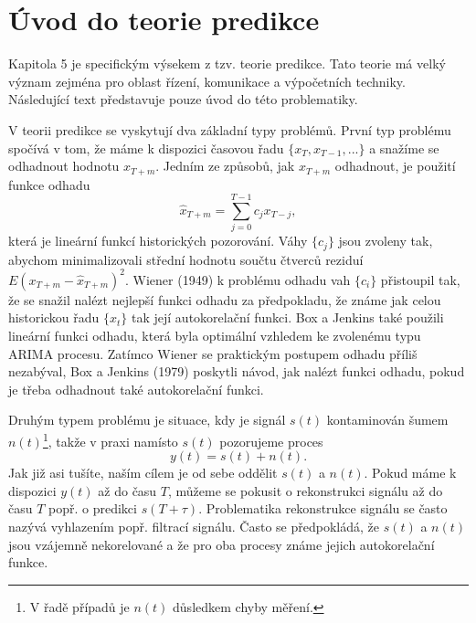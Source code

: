 \section{Úvod do teorie predikce}

Kapitola 5 je specifickým výsekem z tzv. teorie predikce. Tato teorie má velký význam zejména pro oblast řízení, komunikace a výpočetních techniky. Následující text představuje pouze úvod do této problematiky.

V teorii predikce se vyskytují dva základní typy problémů. První typ problému spočívá v tom, že máme k dispozici časovou řadu $\{x_T, x_{T - 1}, ...\}$ a snažíme se odhadnout hodnotu $x_{T + m}$. Jedním ze způsobů, jak $x_{T + m}$ odhadnout, je použití funkce odhadu
\begin{equation}
\hat{x}_{T+m} = \sum_{j = 0}^{T - 1} c_j x_{T - j},
\end{equation}
která je lineární funkcí historických pozorování. Váhy $\{c_j\}$ jsou zvoleny tak, abychom minimalizovali střední hodnotu součtu čtverců reziduí $E(x_{T + m} - \hat{x}_{T + m})^2$. Wiener (1949) k problému odhadu vah $\{c_i\}$ přistoupil tak, že se snažil nalézt nejlepší funkci odhadu za předpokladu, že známe jak celou historickou řadu $\{x_t\}$ tak její autokorelační funkci. Box a Jenkins také použili lineární funkci odhadu, která byla optimální vzhledem ke zvolenému typu ARIMA procesu. Zatímco Wiener se praktickým postupem odhadu příliš nezabýval, Box a Jenkins (1979) poskytli návod, jak nalézt funkci odhadu, pokud je třeba odhadnout také autokorelační funkci.

Druhým typem problému je situace, kdy je signál $s(t)$ kontaminován šumem $n(t)$\footnote{V řadě případů je $n(t)$ důsledkem chyby měření.}, takže v praxi namísto $s(t)$ pozorujeme proces
\begin{equation}
y(t) = s(t) + n(t).
\end{equation}
Jak již asi tušíte, naším cílem je od sebe oddělit $s(t)$ a $n(t)$. Pokud máme k dispozici $y(t)$ až do času $T$, můžeme se pokusit o rekonstrukci signálu až do času $T$ popř. o predikci $s(T + \tau)$. Problematika rekonstrukce signálu se často nazývá vyhlazením popř. filtrací signálu. Často se předpokládá, že $s(t)$ a $n(t)$ jsou vzájemně nekorelované a že pro oba procesy známe jejich autokorelační funkce.


